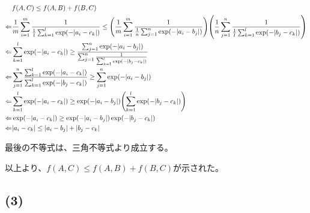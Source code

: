 \documentclass[a4paper, 10pt, dvipdfmx]{jlreq}
\begin{document}
\begin{align*}
             & f(A,C) \leq f(A,B)+f(B,C)                                                                                                                                                                                                                                    \\
  \Leftarrow & \frac{1}{m}\sum_{i=1}^{m}{\frac{1}{\frac{1}{l}\sum_{k=1}^{l}\exp(-|a_i-c_k|)}} \leq \qty(\frac{1}{m}\sum_{i=1}^{m}{\frac{1}{\frac{1}{n}\sum_{j=1}^{n}\exp(-|a_i-b_j|)}})\qty(\frac{1}{n}\sum_{j=1}^{n}{\frac{1}{\frac{1}{l}\sum_{k=1}^{l}\exp(-|b_j-c_k|)}}) \\
  \Leftarrow & \sum_{k=1}^{l}\exp(-|a_i-c_k|) \geq \frac{\sum_{j=1}^{n}\exp(-|a_i-b_j|)}{\sum_{j=1}^{n}{\frac{1}{\sum_{k=1}^{l}\exp(-|b_j-c_k|)}}}                                                                                                                          \\
  \Leftarrow & \sum_{j=1}^{n}{\frac{\sum_{k=1}^{l}\exp(-|a_i-c_k|)}{\sum_{k=1}^{l}\exp(-|b_j-c_k|)}} \geq \sum_{j=1}^{n}\exp(-|a_i-b_j|)                                                                                                                                    \\
  \Leftarrow & \sum_{k=1}^{l}\exp(-|a_i-c_k|) \geq \exp(-|a_i-b_j|)\qty(\sum_{k=1}^{l}\exp(-|b_j-c_k|))                                                                                                                                                                     \\
  \Leftarrow & \exp(-|a_i-c_k|) \geq \exp(-|a_i-b_j|)\exp(-|b_j-c_k|)                                                                                                                                                                                                       \\
  \Leftarrow & |a_i-c_k| \leq |a_i-b_j|+|b_j-c_k|                                                                                                                                                                                                                           \\
\end{align*}

最後の不等式は、三角不等式より成立する。

以上より、$f(A,C) \leq f(A,B)+f(B,C)$が示された。

\subsection*{(3)}
\end{document}
